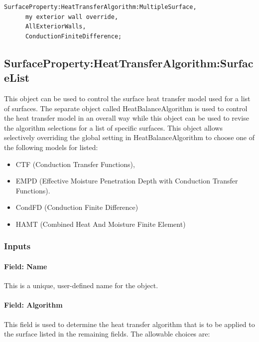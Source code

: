 \begin{lstlisting}
SurfaceProperty:HeatTransferAlgorithm:MultipleSurface,
      my exterior wall override,
      AllExteriorWalls,
      ConductionFiniteDifference;
\end{lstlisting}

\subsection{SurfaceProperty:HeatTransferAlgorithm:SurfaceList}\label{surfacepropertyheattransferalgorithmsurfacelist}

This object can be used to control the surface heat transfer model used for a list of surfaces. The separate object called HeatBalanceAlgorithm is used to control the heat transfer model in an overall way while this object can be used to revise the algorithm selections for a list of specific surfaces. This object allows selectively overriding the global setting in HeatBalanceAlgorithm to choose one of the following models for listed:

\begin{itemize}
\item
  CTF (Conduction Transfer Functions),
\item
  EMPD (Effective Moisture Penetration Depth with Conduction Transfer Functions).
\item
  CondFD (Conduction Finite Difference)
\item
  HAMT (Combined Heat And Moisture Finite Element)
\end{itemize}

\subsubsection{Inputs}\label{inputs-2-000}

\paragraph{Field: Name}\label{field-name-1}

This is a unique, user-defined name for the object.

\paragraph{Field: Algorithm}\label{field-algorithm-2}

This field is used to determine the heat transfer algorithm that is to be applied to the surface listed in the remaining fields. The allowable choices are:

